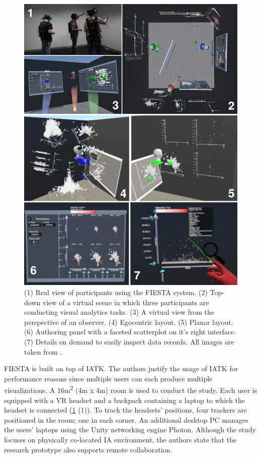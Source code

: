 \documentclass{vgtc}                          %
\begin{document}
\begin{figure}[tb]
	\centering
	\includegraphics[width=\columnwidth]{fiesta}
	\caption{(1) Real view of participants using the FIESTA system. (2)
		Top-down view of a virtual scene in which three participants are
		conducting visual analytics tasks. (3) A virtual view from the perspective of an
		observer. (4) Egocentric layout. (5) Planar layout. (6) Authoring panel
		with a faceted scatterplot on it's right interface. (7) Details on
		demand to easily inspect data records. All images are taken from
		\cite{fiesta_prototype}.}
	\label{fig:fiesta}
\end{figure}

\noindent FIESTA is built on top of IATK. The authors justify the usage of IATK
for performance reasons since multiple users can each produce multiple
visualizations. A 16m\textsuperscript{2} (4m x 4m) room is used to conduct the
study. Each user is equipped with a VR headset and a backpack containing a
laptop to which the headset is connected (\cref{fig:fiesta} (1)). To track the
headsets' positions, four trackers are positioned in the room; one in each
corner. An additional desktop PC manages the users' laptops using the Unity
networking engine Photon. Although the study focuses on physically co-located
IA environment, the authors state that the research prototype also supports
remote collaboration.
\end{document}
